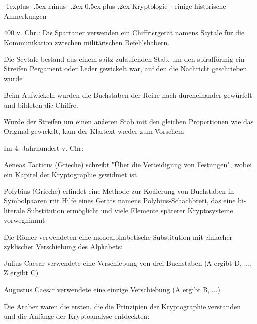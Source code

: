 \documentclass[a4paper]{article}
\makeatletter
\renewcommand{\subsection}{\@startsection{subsection}{2}{0mm}%
 {-1explus -.5ex minus -.2ex}%
 {0.5ex plus .2ex}%
 {\normalfont\normalsize\bfseries}}
\makeatother
\begin{document}
\begin{multicols}{3}
      \subsection{Kryptologie - einige historische
            Anmerkungen}

      \begin{itemize*}
            \item
            400 v. Chr.: Die Spartaner verwenden ein Chiffriergerät namens Scytale
            für die Kommunikation zwischen militärischen Befehlshabern.

            \begin{itemize*}
                  \item Die Scytale bestand aus einem spitz zulaufenden Stab, um den spiralförmig ein Streifen Pergament oder Leder gewickelt war, auf den die Nachricht geschrieben wurde
                  \item Beim Aufwickeln wurden die Buchstaben der Reihe nach durcheinander gewürfelt und bildeten die Chiffre.
                  \item Wurde der Streifen um einen anderen Stab mit den gleichen Proportionen wie das Original gewickelt, kam der Klartext wieder zum Vorschein
            \end{itemize*}
            \item
            Im 4. Jahrhundert v. Chr:

            \begin{itemize*}
                  \item Aeneas Tacticus (Grieche) schreibt "Über die Verteidigung von Festungen", wobei ein Kapitel der Kryptographie gewidmet ist
                  \item Polybius (Grieche) erfindet eine Methode zur Kodierung von Buchstaben in Symbolpaaren mit Hilfe eines Geräts namens Polybius-Schachbrett, das eine bi-literale Substitution ermöglicht und viele Elemente späterer Kryptosysteme vorwegnimmt
            \end{itemize*}
            \item
            Die Römer verwendeten eine monoalphabetische Substitution mit
            einfacher zyklischer Verschiebung des Alphabets:

            \begin{itemize*}
                  \item Julius Caesar verwendete eine Verschiebung von drei Buchstaben (A ergibt D, ..., Z ergibt C)
                  \item Augustus Caesar verwendete eine einzige Verschiebung (A ergibt B, ...)
            \end{itemize*}
            \item
            Die Araber waren die ersten, die die Prinzipien der Kryptographie
            verstanden und die Anfänge der Kryptoanalyse entdeckten:


\end{itemize*}
\end{multicols}
\end{document}
